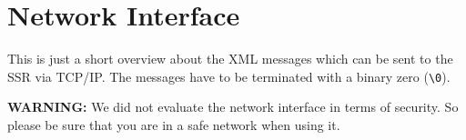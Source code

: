 
\section{Network Interface}
\label{sec:network}

This is just a short overview about the XML messages which can be sent to the
SSR via TCP/IP.
The messages have to be terminated with a binary zero (\verb|\0|).

\textbf{WARNING:} We
did not evaluate the network interface in terms of security. So please be sure
that you are in a safe network when using it.



%

